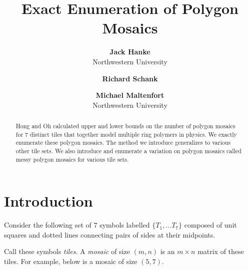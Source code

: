 \documentclass[12pt]{article}
\date{}
\author{
    \textbf{Jack Hanke}\\
    Northwestern University
    \and
    \textbf{Richard Schank}\\
    \and
    \textbf{Michael Maltenfort}\\
    Northwestern University
    }
\title{\textbf{Exact Enumeration of Polygon Mosaics}}
\theoremstyle{plain}
\theoremstyle{definition}
\theoremstyle{remark}
\theoremstyle{definition}
\newcommand{\cell}[4]{ \draw[thick] ( #1 , #2 ) rectangle ( #3 , #4 );}
\newcommand{\cellA}[4]{ \draw[thick] ( #1 , #2 ) rectangle ( #3 , #4 ); \draw[red, thick, densely dotted] (#3 * 0.5 + #1 * 0.5 , #2) -- (#3, #4 * 0.5 + #2 * 0.5);}
\newcommand{\cellB}[4]{ \draw[thick] ( #1 , #2 ) rectangle ( #3 , #4 ); \draw[red, thick, densely dotted] (#3 * 0.5 + #1 * 0.5 , #2) -- (#1, #4 * 0.5 + #2 * 0.5);}
\newcommand{\cellC}[4]{ \draw[thick] ( #1 , #2 ) rectangle ( #3 , #4 ); \draw[red, thick, densely dotted] (#3 * 0.5 + #1 * 0.5 , #4) -- (#1, #4 * 0.5 + #2 * 0.5);}
\newcommand{\cellD}[4]{ \draw[thick] ( #1 , #2 ) rectangle ( #3 , #4 ); \draw[red, thick, densely dotted] (#3 * 0.5 + #1 * 0.5 , #4) -- (#3, #4 * 0.5 + #2 * 0.5);}
\newcommand{\cellE}[4]{ \draw[thick] ( #1 , #2 ) rectangle ( #3 , #4 ); \draw[red, thick, densely dotted] (#3 * 0.5 + #1 * 0.5 , #2) -- (#3 * 0.5 + #1 * 0.5 , #4);}
\newcommand{\cellF}[4]{ \draw[thick] ( #1 , #2 ) rectangle ( #3 , #4 ); \draw[red, thick, densely dotted] (#3, #4 * 0.5 + #2 * 0.5) -- (#1, #4 * 0.5 + #2 * 0.5);}
\newcommand{\lablnode}[3]{\node[shape=circle,draw=none,fill=none, inner sep=0pt,minimum size=5pt] (A) at ( #1 , #2 ) {#3};}
\begin{document}
\maketitle

\begin{center}

    \begin{abstract}
        Hong and Oh calculated upper and lower bounds on the number of polygon mosaics for $7$ distinct tiles that together model multiple ring polymers in physics. We exactly enumerate these polygon mosaics. The method we introduce generalizes to various other tile sets. We also introduce and enumerate a variation on polygon mosaics called messy polygon mosaics for various tile sets.
    \end{abstract}

\end{center}

\section{Introduction}

Consider the following set of $7$ symbols labelled $\{ T_1, \dots T_7 \}$ composed of unit squares and dotted lines connecting pairs of sides at their midpoints.

\begin{center}
\end{center}

Call these symbols \textit{tiles}. A \textit{mosaic} of size $(m,n)$ is an $m \times n$ matrix of these tiles. For example, below is a mosaic of size $(5,7)$.
\end{document}
